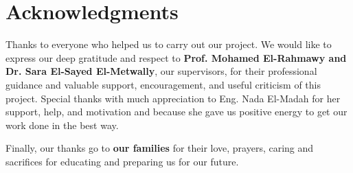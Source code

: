 \chapter*{Acknowledgments}
Thanks to everyone who helped us to carry out our project. 
We would like to express our deep gratitude and respect to \textbf{Prof. Mohamed El-Rahmawy and Dr. Sara El-Sayed El-Metwally}, our supervisors, for their professional guidance and valuable support, encouragement, and useful criticism of this project. Special thanks with much appreciation to Eng. Nada El-Madah  for her support, help, and motivation and because she gave us positive energy to get our work done in the best way.

Finally, our thanks go to \textbf{our families }for their love, prayers, caring and sacrifices for educating and preparing us for our future.
